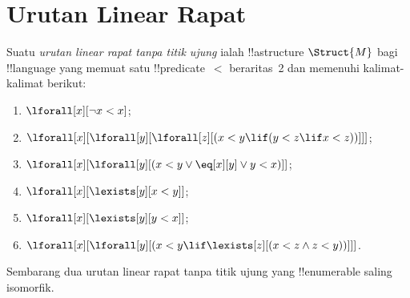 \documentclass[../../../include/open-logic-section]{subfiles}
\begin{document}
\section{Urutan Linear Rapat}

\begin{defn}
  Suatu \emph{urutan linear rapat tanpa titik ujung} ialah
  !!a{structure} $\Struct{M}$ bagi !!{language} yang memuat satu
  !!{predicate}~$<$ beraritas~2 dan memenuhi kalimat-kalimat berikut:
  \begin{enumerate}
  \item $\lforall[x][\lnot x < x]$;
  \item $\lforall[x][\lforall[y][\lforall[z][(x < y \lif (y < z \lif x
    <z ))]]]$;
  \item $\lforall[x][\lforall[y][(x< y \lor \eq[x][y] \lor y < x)]]$;
  \item $\lforall[x][\lexists[y][x < y]]$;
  \item $\lforall[x][\lexists[y][y < x]]$;
  \item $\lforall[x][\lforall[y][(x < y \lif \lexists[z][(x < z \land
        z < y))]]]$.
 \end{enumerate}
\end{defn}

\begin{thm}
  Sembarang dua urutan linear rapat tanpa titik ujung yang !!{enumerable}
  saling isomorfik.
\end{thm}
\end{document}
